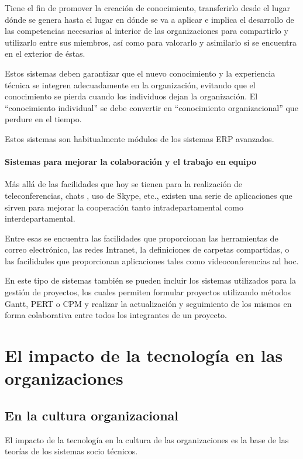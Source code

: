 \documentclass[a4paper, 12pt]{article}
\begin{document}
Tiene el fin de promover la creación de conocimiento, transferirlo desde el lugar dónde se genera hasta el lugar en dónde se va a aplicar e implica el desarrollo de las competencias necesarias al interior de las organizaciones para compartirlo y utilizarlo entre sus miembros, así como para valorarlo y asimilarlo si se encuentra en el exterior de éstas.

Estos sistemas deben garantizar que el nuevo conocimiento y la experiencia técnica se integren adecuadamente en la organización, evitando que el conocimiento se pierda cuando los individuos dejan la organización. El “conocimiento individual” se debe convertir en “conocimiento organizacional” que perdure en el tiempo.

Estos sistemas son habitualmente módulos de los sistemas ERP avanzados.

\paragraph{Sistemas para mejorar la colaboración y el trabajo en equipo}
Más allá de las facilidades que hoy se tienen para la realización de teleconferencias, chats , uso de Skype, etc., existen una serie de aplicaciones que sirven para mejorar la cooperación tanto intradepartamental como interdepartamental.

Entre esas se encuentra las facilidades que proporcionan las herramientas de correo electrónico, las redes Intranet, la definiciones de carpetas compartidas, o las facilidades que proporcionan aplicaciones tales como videoconferencias ad hoc.

En este tipo de sistemas también se pueden incluir los sistemas utilizados para la gestión de proyectos, los cuales permiten formular proyectos utilizando métodos Gantt, PERT o CPM y realizar la actualización y seguimiento de los mismos en forma colaborativa entre todos los integrantes de un proyecto.

\section{El impacto de la tecnología en las organizaciones}
\subsection{En la cultura organizacional}

El impacto de la tecnología en la cultura de las organizaciones es la base de las teorías de los sistemas socio técnicos. 
\end{document}
